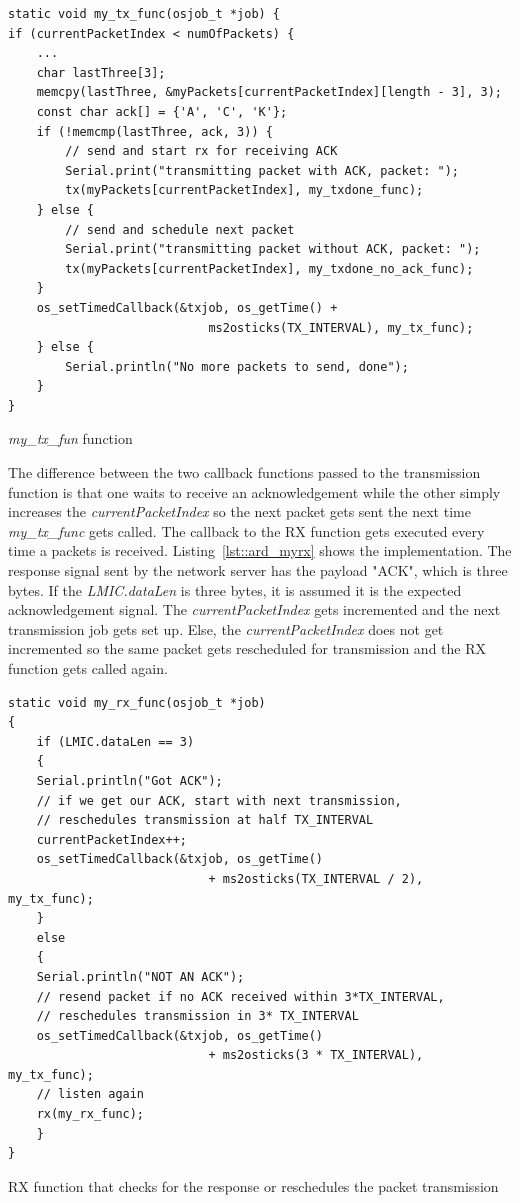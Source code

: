 \begin{listing}[h]
    \begin{verbatim}
static void my_tx_func(osjob_t *job) {
if (currentPacketIndex < numOfPackets) {
    ...
    char lastThree[3];
    memcpy(lastThree, &myPackets[currentPacketIndex][length - 3], 3);
    const char ack[] = {'A', 'C', 'K'};
    if (!memcmp(lastThree, ack, 3)) {
        // send and start rx for receiving ACK
        Serial.print("transmitting packet with ACK, packet: ");
        tx(myPackets[currentPacketIndex], my_txdone_func);
    } else {
        // send and schedule next packet
        Serial.print("transmitting packet without ACK, packet: ");
        tx(myPackets[currentPacketIndex], my_txdone_no_ack_func);
    }
    os_setTimedCallback(&txjob, os_getTime() +
                            ms2osticks(TX_INTERVAL), my_tx_func);
    } else {
        Serial.println("No more packets to send, done");
    }
}
    \end{verbatim}
    \caption{\emph{my\_tx\_fun} function}
    \label{lst::ard_mytx}
\end{listing}

The difference between the two callback functions passed to the transmission function is that one
waits to receive an acknowledgement while the other simply increases the \emph{currentPacketIndex}
so the next packet gets sent the next time \emph{my\_tx\_func} gets called.
The callback to the RX function gets executed every time a packets is received.
Listing~\ref{lst::ard_myrx} shows the implementation. The response signal sent
by the network server has the payload "ACK", which is three bytes. 
If the \emph{LMIC.dataLen} is three bytes, it is assumed it is the expected acknowledgement signal.
The \emph{currentPacketIndex} gets incremented and the next transmission job gets set up.
Else, the \emph{currentPacketIndex} does not get incremented so the same packet gets rescheduled 
for transmission and the RX function gets called again.


\begin{listing}[h]
    \begin{verbatim}
static void my_rx_func(osjob_t *job)
{
    if (LMIC.dataLen == 3)
    {
    Serial.println("Got ACK");
    // if we get our ACK, start with next transmission, 
    // reschedules transmission at half TX_INTERVAL
    currentPacketIndex++;
    os_setTimedCallback(&txjob, os_getTime()
                            + ms2osticks(TX_INTERVAL / 2), my_tx_func);
    }
    else
    {
    Serial.println("NOT AN ACK");
    // resend packet if no ACK received within 3*TX_INTERVAL,
    // reschedules transmission in 3* TX_INTERVAL
    os_setTimedCallback(&txjob, os_getTime() 
                            + ms2osticks(3 * TX_INTERVAL), my_tx_func);
    // listen again
    rx(my_rx_func);
    }
}
    \end{verbatim}
    \caption{RX function that checks for the response or reschedules the packet transmission}
    \label{lst::ard_myrx}
\end{listing}

